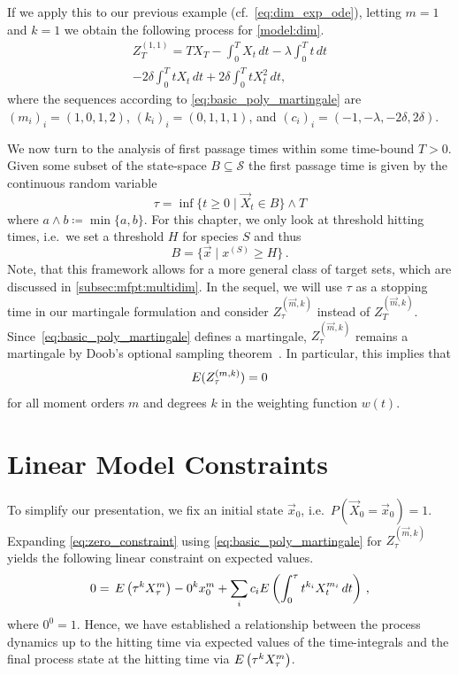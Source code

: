 \begin{example}
  If we apply this to our previous example
  (cf.\ \eqref{eq:dim_exp_ode}), letting $m=1$ %
  and $k=1$ we obtain the following process for \autoref{model:dim}.
  \begin{multline*}
    Z_T^{(1,1)} = TX_T - \int_0^T X_t\,dt
    - \lambda \int_0^T t\,dt\\ - 2\delta
    \int_0^T t X_t\,dt +
    2{\delta}\int_0^TtX_t^2\,dt,
  \end{multline*}
  where the sequences according to \eqref{eq:basic_poly_martingale}
  are $(m_i)_i=(1,0,1,2)$, $(k_i)_i=(0,1,1,1)$,
  and $(c_i)_i=(-1,-\lambda, -2\delta,2\delta)$.
\end{example}
We now turn to the analysis of first passage times within some time-bound
$T>0$. Given some subset of the state-space
$B\subseteq \mathcal{S}$ the first passage time is given by the
continuous random variable
\[
  \tau = \inf\{t\geq 0\mid \vec X_t \in B\} \land T
\]
where $a \land b \coloneqq \min\{a, b\}$.
For this chapter, we only look at threshold hitting times,
i.e.\ we set a threshold $H$ for species $S$ and thus
\[
  B=\{\vec{x}\mid x^{(S)}\geq H\}\,.
\]
Note, that this framework
allows for a more general class of target sets, which are discussed in
\autoref{subsec:mfpt:multidim}.
In the sequel, we will use $\tau$ as a stopping time in our martingale
formulation and consider
$Z_\tau^{(\vec m, k)}$ instead of $Z_T^{(\vec m, k)}$.
Since~\eqref{eq:basic_poly_martingale} defines a martingale,
$Z_{\tau}^{(\vec m, k)}$
remains a martingale by
Doob's optional sampling theorem~\parencite{gihmantheory}. In particular, this
implies that
\begin{equation}\label{eq:zero_constraint}
  {E}(Z_{\tau}^{(m, k)})=0
\end{equation}
for all moment orders $m$ and
degrees $k$ in the weighting function $w(t)$.

\section{Linear Model Constraints}
To simplify our presentation, we fix an initial state $\vec x_0$,
i.e.\ $P(\vec X_0=\vec x_0)=1$.
Expanding \eqref{eq:zero_constraint} using
\eqref{eq:basic_poly_martingale} for $Z_{\tau}^{(\vec m, k)}$
yields the following linear constraint on expected values.
\begin{equation}\label{eq:constraint}
  0 = \,{E}\left({\tau}^kX_{\tau}^{m}\right)
  - 0^kx_0^{m}
  + \sum_{i}c_i{E}\left(\int_{0}^{\tau} t^{k_i} X_t^{m_i}\,dt\right)\,,
\end{equation}
where $0^0=1$.
Hence, we have established a relationship between the process dynamics
up to the hitting time via expected values of the time-integrals and
the final process state at
the hitting time via ${E}\left(\tau^k {X}_{\tau}^{{m}}\right)$.

